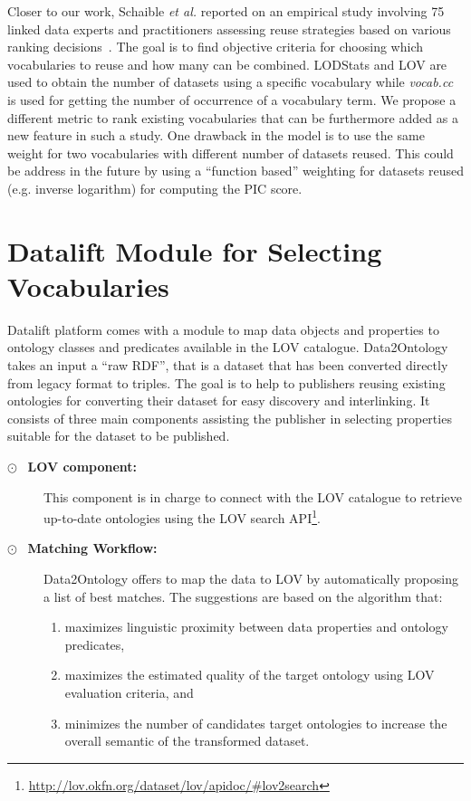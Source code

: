 \begin{description}
Closer to our work, Schaible \emph{et al.} reported on an empirical study involving 75 linked data experts and practitioners assessing reuse strategies based on various ranking decisions~\cite{Schaible:ESWC14}. The goal is to find objective criteria for choosing which vocabularies to reuse and how many can be combined. LODStats and LOV are used to obtain the number of datasets using a specific vocabulary while \textit{vocab.cc} is used for getting the number of occurrence of a vocabulary term. We propose a different metric to rank existing vocabularies that can be furthermore added as a new feature in such a study. One drawback in the model is to use the same weight for two vocabularies with different number of datasets reused. This could be address in the future by using a ``function based'' weighting for datasets reused (e.g. inverse logarithm) for computing the PIC score.



\section{Datalift Module for Selecting Vocabularies}
\label{sec:data2rdf}
Datalift platform comes with a module to map data objects and properties to ontology classes and predicates available in the LOV catalogue. Data2Ontology takes an input a ``raw RDF'', that is a dataset that has been converted directly from legacy format to triples. The goal is to help to publishers reusing existing ontologies for converting their dataset for easy discovery and interlinking. It consists of three main components assisting the publisher in selecting properties suitable for the dataset to be published. \begin{description}
\item[$\odot$~ \textbf{LOV component:}] This component is in charge to connect with the LOV catalogue to retrieve up-to-date ontologies using the LOV search API\footnote{\url{http://lov.okfn.org/dataset/lov/apidoc/\#lov2search}}.
\item[$\odot$~ \textbf{Matching Workflow:}] Data2Ontology offers to map the data to LOV by automatically proposing a list of best matches. The suggestions are based on the algorithm that:
   \begin{enumerate}
   \item maximizes linguistic proximity between data properties and ontology predicates,
   \item maximizes the estimated quality of the target ontology using LOV evaluation criteria, and
   \item minimizes the number of candidates target ontologies to increase the overall semantic of the transformed dataset.
   \end{enumerate}


\end{description}
\end{description}

